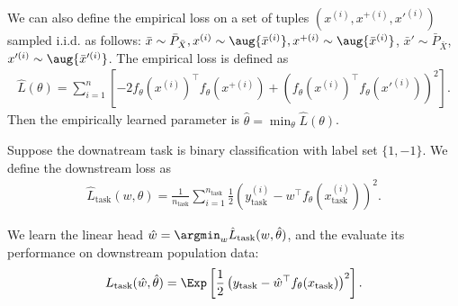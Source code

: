 We can also define the empirical loss on a set of tuples $(x^{(i)}, x^{+(i)}, x'^{(i)})$ sampled i.i.d. as follows: $\bar{x}\sim\bar{P}_{\bar{X}}, x^{(i)}\sim\aug{\bar{x}^{(i)}}, x^{+(i)}\sim\aug{\bar{x}^{(i)}}$, $\bar{x}'\sim\bar{P}_{\bar{X}}$, $x'^{(i)}\sim\aug{\bar{x}'^{(i)}}$. The empirical loss is defined as 
\begin{align}
	\hat{L}(\theta) = \sum_{i=1}^n \left[-2f_{{\theta}}(x^{(i)})^\top f_{{\theta}}(x^{+(i)}) + \left(f_{{\theta}}(x^{(i)})^\top f_{{\theta}}(x'^{(i)})\right)^2\right].
\end{align}
Then the empirically learned parameter is $\hat{\theta} = \min_{\theta} \hat{L}(\theta)$. 

Suppose the downatream task is binary classification with label set $\{1, -1\}$. We define the downstream loss as 
\begin{align}
	\hat{L}_{\text{task}}(w, \theta) = \frac{1}{n_{\text{task}}} \sum_{i=1}^{n_{\text{task}}} \frac{1}{2} \left(y^{(i)}_{\text{task}} - w^\top f_{{\theta}}(x^{(i)}_{\text{task}})\right)^2.
\end{align}

We learn the linear head $\hat{w} = \argmin_w \hat{L}_{\text{task}}(w, \hat{\theta})$, and the evaluate its performance on downstream population data:
\begin{align}
	L_{\text{task}}(\hat{w}, \hat{\theta}) = \Exp\left[\frac{1}{2} \left(y_{\text{task}} - \hat{w}^\top f_{{\theta}}(x_{\text{task}})\right)^2\right].
\end{align}

